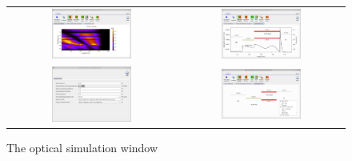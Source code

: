 \begin{figure}[H]
\centering
\begin{tabular}{ c c }

\includegraphics[width=0.5\textwidth,height=0.4\textwidth]{./images/opticalsimulation.png}

&
\includegraphics[width=0.5\textwidth,height=0.4\textwidth]{./images/opticalsimulation1.png}

\\
\includegraphics[width=0.5\textwidth,height=0.4\textwidth]{./images/opticalsimulation2.png}

&
\includegraphics[width=0.5\textwidth,height=0.4\textwidth]{./images/opticalsimulation3.png}

\\
\end{tabular}
\caption{The optical simulation window}
\label{fig:transfermatrix1}
\end{figure}



